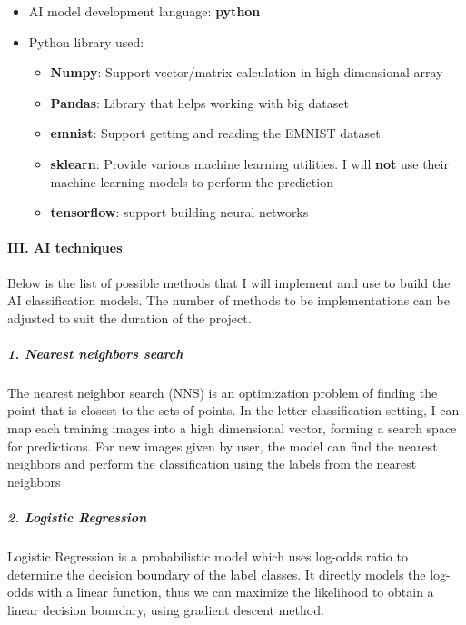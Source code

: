 \documentclass[12pt,english,]{article}
\providecommand{\tightlist}{%
  \setlength{\itemsep}{0pt}\setlength{\parskip}{0pt}}
\let\oldparagraph\paragraph
\renewcommand{\paragraph}[1]{\oldparagraph{#1}\mbox{}}
\let\oldsubparagraph\subparagraph
\renewcommand{\subparagraph}[1]{\oldsubparagraph{#1}\mbox{}}
\begin{document}
\begin{itemize}
\tightlist
\item
  AI model development language: \textbf{python}
\item
  Python library used:

  \begin{itemize}
  \tightlist
  \item
    \textbf{Numpy}: Support vector/matrix calculation in high
    dimensional array
  \item
    \textbf{Pandas}: Library that helps working with big dataset
  \item
    \textbf{emnist}: Support getting and reading the EMNIST dataset
  \item
    \textbf{sklearn}: Provide various machine learning utilities. I will
    \textbf{not} use their machine learning models to perform the
    prediction
  \item
    \textbf{tensorflow}: support building neural networks
  \end{itemize}
\end{itemize}

\hypertarget{iii.-ai-techniques}{%
\paragraph{III. AI techniques}\label{iii.-ai-techniques}}

Below is the list of possible methods that I will implement and use to
build the AI classification models. The number of methods to be
implementations can be adjusted to suit the duration of the project.

\hypertarget{nearest-neighbors-search}{%
\subparagraph{1. Nearest neighbors
search}\label{nearest-neighbors-search}}

The nearest neighbor search (NNS) is an optimization problem of finding
the point that is closest to the sets of points. In the letter
classification setting, I can map each training images into a high
dimensional vector, forming a search space for predictions. For new
images given by user, the model can find the nearest neighbors and
perform the classification using the labels from the nearest neighbors

\hypertarget{logistic-regression}{%
\subparagraph{2. Logistic Regression}\label{logistic-regression}}

Logistic Regression is a probabilistic model which uses log-odds ratio
to determine the decision boundary of the label classes. It directly
models the log-odds with a linear function, thus we can maximize the
likelihood to obtain a linear decision boundary, using gradient descent
method.
\end{document}
